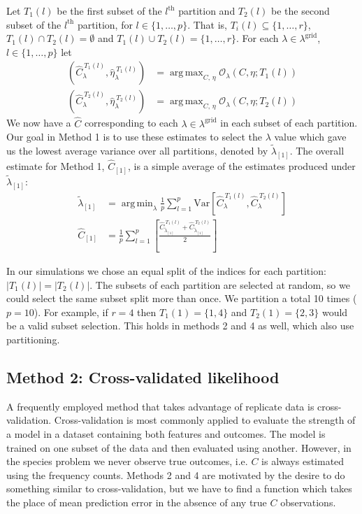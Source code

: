 \documentclass[oupdraft]{bio}
\DeclareMathOperator*{\argmin}{arg\,min}
\DeclareMathOperator*{\argmax}{arg\,max}
\newcommand{\lambdagrid}{\lambda^{\text{grid}}}
\begin{document}
Let $T_1(l)$ be the first subset of the $l^{\text{th}}$ partition and $T_2(l)$ be the second subset of the $l^{\text{th}}$ partition, for $l \in \{1, \dots , p\}$. That is, $T_i(l) \subseteq \{1, \dots , r\}$, $T_1(l) \cap T_2(l) = \emptyset$ and $T_1(l) \cup T_2(l) = \{1, \dots ,r\}$.
For each $\lambda \in \lambda^{\text{grid}}$, $l \in \{1, \dots, p\}$ let
\begin{align}
\left(\widehat{C}_{\lambda}^{ \ T_1(l)}, \widehat{\eta}_{\lambda}^{ \ T_1(l)} \right) &= \argmax_{C, \, \eta} \mathcal{O}_\lambda \left(C, \eta; T_1(l) \right) \\
\left(\widehat{C}_{\lambda}^{ \ T_2(l)}, \widehat{\eta}_{\lambda}^{ \ T_2(l)} \right) &= \argmax_{C, \, \eta} \mathcal{O}_\lambda \left(C, \eta; T_2(l) \right)
\end{align}
We now have a $\widehat{C}$ corresponding to each $\lambda \in \lambdagrid$ in each subset of each partition.  Our goal in Method 1 is to use these estimates to select the $\lambda$ value which gave us the lowest average variance over all partitions, denoted by $\widetilde{\lambda}_{[1]}$.  The overall estimate for Method 1, $\widehat{C}_{[1]}$, is a simple average of the estimates produced under $\widetilde{\lambda}_{[1]}$:
\begin{align}
\widetilde{\lambda}_{[1]} &= \argmin_{\lambda} \frac{1}{p} \sum_{l=1}^p \text{Var}\left[ \widehat{C}_{\lambda}^{ \ T_1(l)}, \widehat{C}_{\lambda}^{ \ T_2(l)} \right] \\
\widehat{C}_{[1]} &=  \frac{1}{p} \sum_{l=1}^p \left[ \frac{\widehat{C}_{\widetilde{\lambda}_{[1]}}^{ \ T_1(l)} + \widehat{C}_{\widetilde{\lambda}_{[1]}}^{ \ T_2(l)}}{2} \right]
\end{align}

In our simulations we chose an equal split of the indices for each partition: $|T_1(l)| = |T_2(l)|$.  The subsets of each partition are selected at random, so we could select the same subset split more than once.  We partition a total 10 times ($p = 10$).  For example, if $r = 4$ then $T_1(1) = \{1,4\}$ and $T_2(1) = \{2, 3\}$ would be a valid subset selection.  This holds in methods 2 and 4 as well, which also use partitioning.

\subsection{Method 2: Cross-validated likelihood}


A frequently employed method that takes advantage of replicate data is cross-validation.  Cross-validation is most commonly applied to evaluate the strength of a model in a dataset containing both features and outcomes.  The model is trained on one subset of the data and then evaluated using another.  However, in the species problem we never observe true outcomes, i.e. $C$ is always estimated using the frequency counts.  Methods 2 and 4 are motivated by the desire to do something similar to cross-validation, but we have to find a function which takes the place of mean prediction error in the absence of any true $C$ observations.
\end{document}
